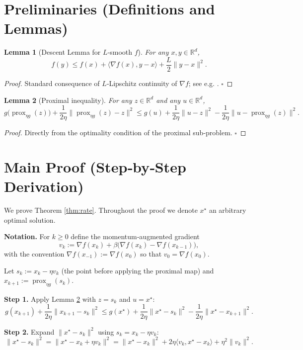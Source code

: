\documentclass[11pt]{article}
\newtheorem{lemma}{Lemma}
\newcommand{\prox}{\operatorname{prox}}
\newcommand{\grad}{\nabla}
\newcommand{\R}{\mathbb{R}}
\begin{document}
\newpage
\section*{Preliminaries (Definitions and Lemmas)}
\begin{lemma}[Descent Lemma for $L$‑smooth $f$]\label{lem:descent}
For any $x,y\in\R^{d}$,
\[
f(y)\le f(x)+\langle \grad f(x),y-x\rangle+\frac{L}{2}\|y-x\|^{2}.
\]
\end{lemma}
\begin{proof}
Standard consequence of $L$‑Lipschitz continuity of $\grad f$; see e.g. \cite{Nesterov04}. \hfill $\square$
\end{proof}

\begin{lemma}[Proximal inequality]\label{lem:prox}
For any $z\in\R^{d}$ and any $u\in\R^{d}$,
\[
g\bigl(\prox_{\eta g}(z)\bigr)+\frac{1}{2\eta}\bigl\|\prox_{\eta g}(z)-z\bigr\|^{2}
\le g(u)+\frac{1}{2\eta}\|u-z\|^{2}-\frac{1}{2\eta}\bigl\|u-\prox_{\eta g}(z)\bigr\|^{2}.
\]
\end{lemma}
\begin{proof}
Directly from the optimality condition of the proximal sub‑problem. \hfill $\square$
\end{proof}

\section*{Main Proof (Step‑by‑Step Derivation)}
We prove Theorem \ref{thm:rate}. Throughout the proof we denote $x^\star$ an arbitrary optimal solution.

\bigskip
\noindent\textbf{Notation.} For $k\ge0$ define the momentum‑augmented gradient
\[
v_k:=\grad f(x_k)+\beta\bigl(\grad f(x_k)-\grad f(x_{k-1})\bigr),
\]
with the convention $\grad f(x_{-1}):=\grad f(x_0)$ so that $v_0=\grad f(x_0)$.  

Let $s_k:=x_k-\eta v_k$ (the point before applying the proximal map) and $x_{k+1}:=\prox_{\eta g}(s_k)$.

\bigskip
\noindent\textbf{Step 1.} Apply Lemma \ref{lem:prox} with $z=s_k$ and $u=x^\star$:
\[
g(x_{k+1})+\frac{1}{2\eta}\|x_{k+1}-s_k\|^{2}
\le g(x^\star)+\frac{1}{2\eta}\|x^\star-s_k\|^{2}
-\frac{1}{2\eta}\|x^\star-x_{k+1}\|^{2}.
\tag{1}
\]

\noindent\textbf{Step 2.} Expand $\|x^\star-s_k\|^{2}$ using $s_k=x_k-\eta v_k$:
\[
\|x^\star-s_k\|^{2}
= \|x^\star-x_k+\eta v_k\|^{2}
= \|x^\star-x_k\|^{2}+2\eta\langle v_k, x^\star-x_k\rangle+\eta^{2}\|v_k\|^{2}.
\tag{2}
\]
\end{document}
